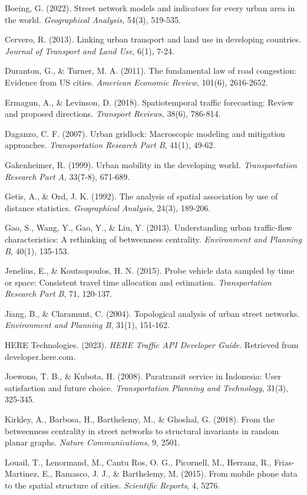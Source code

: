Boeing, G. (2022). Street network models and indicators for every urban area in the world. \emph{Geographical Analysis}, 54(3), 519-535.

Cervero, R. (2013). Linking urban transport and land use in developing countries. \emph{Journal of Transport and Land Use}, 6(1), 7-24.

Duranton, G., \& Turner, M. A. (2011). The fundamental law of road congestion: Evidence from US cities. \emph{American Economic Review}, 101(6), 2616-2652.

Ermagun, A., \& Levinson, D. (2018). Spatiotemporal traffic forecasting: Review and proposed directions. \emph{Transport Reviews}, 38(6), 786-814.

Daganzo, C. F. (2007). Urban gridlock: Macroscopic modeling and mitigation approaches. \emph{Transportation Research Part B}, 41(1), 49-62.

Gakenheimer, R. (1999). Urban mobility in the developing world. \emph{Transportation Research Part A}, 33(7-8), 671-689.

Getis, A., \& Ord, J. K. (1992). The analysis of spatial association by use of distance statistics. \emph{Geographical Analysis}, 24(3), 189-206.

Gao, S., Wang, Y., Gao, Y., \& Liu, Y. (2013). Understanding urban traffic-flow characteristics: A rethinking of betweenness centrality. \emph{Environment and Planning B}, 40(1), 135-153.

Jenelius, E., \& Koutsopoulos, H. N. (2015). Probe vehicle data sampled by time or space: Consistent travel time allocation and estimation. \emph{Transportation Research Part B}, 71, 120-137.

Jiang, B., \& Claramunt, C. (2004). Topological analysis of urban street networks. \emph{Environment and Planning B}, 31(1), 151-162.

HERE Technologies. (2023). \emph{HERE Traffic API Developer Guide}. Retrieved from developer.here.com.

Joewono, T. B., \& Kubota, H. (2008). Paratransit service in Indonesia: User satisfaction and future choice. \emph{Transportation Planning and Technology}, 31(3), 325-345.

Kirkley, A., Barbosa, H., Barthelemy, M., \& Ghoshal, G. (2018). From the betweenness centrality in street networks to structural invariants in random planar graphs. \emph{Nature Communications}, 9, 2501.

Louail, T., Lenormand, M., Cantu Ros, O. G., Picornell, M., Herranz, R., Frias-Martinez, E., Ramasco, J. J., \& Barthelemy, M. (2015). From mobile phone data to the spatial structure of cities. \emph{Scientific Reports}, 4, 5276.

